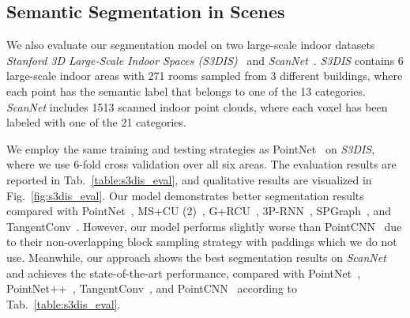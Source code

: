 \documentclass[10pt,twocolumn,letterpaper]{article}
\begin{document}
\subsection{Semantic Segmentation in Scenes}\vspace{-1mm}
\setcounter{figure}{+4}
\begin{figure*}[t]
\centering
{}
\vspace{-3.5mm}
\vspace{-3mm}
\caption{Qualitative results on \emph{S3DIS} dataset. We compare our results with PointNet~\cite{qi2017pointnet} and ground truth. 
The auditorium is a challenging room type and appears only in Area 2. Our model produces much better segmentation result, compared with the result of PointNet.}\vspace{-3mm}
\label{fig:s3dis_eval}
\end{figure*}

We also evaluate our segmentation model on two large-scale indoor datasets \emph{Stanford 3D Large-Scale Indoor Spaces (S3DIS)}~\cite{armeni20163d} and \emph{ScanNet}~\cite{dai2017scannet}. \emph{S3DIS} contains 6 large-scale indoor areas with 271 rooms sampled from 3 different buildings, where each point has the semantic label that belongs to one of the 13 categories. 
\emph{ScanNet} includes 1513 scanned indoor point clouds, where each voxel has been labeled with one of the 21 categories.




We employ the same training and testing strategies as PointNet~\cite{qi2017pointnet} on \emph{S3DIS}, where we use 6-fold cross validation over all six areas. The evaluation results are reported in Tab.~\ref{table:s3dis_eval}, and qualitative results are visualized in Fig.~\ref{fig:s3dis_eval}. Our model demonstrates better segmentation results compared with PointNet~\cite{qi2017pointnet}, MS+CU (2)~\cite{engelmann2017exploring}, G+RCU~\cite{engelmann2017exploring}, 3P-RNN~\cite{Ye_2018_ECCV}, SPGraph~\cite{Landrieu2017LargescalePC}, and TangentConv~\cite{tatarchenko2018tangent}. However, our model performs slightly worse than PointCNN~\cite{li2018pointcnn} due to their non-overlapping block sampling strategy with paddings which we do not use. Meanwhile, our approach shows the best segmentation results on \emph{ScanNet}~\cite{dai2017scannet} and achieves the state-of-the-art performance, compared with PointNet~\cite{qi2017pointnet}, PointNet++~\cite{qi2017pointnet++}, TangentConv~\cite{tatarchenko2018tangent}, and PointCNN~\cite{li2018pointcnn} according to Tab.~\ref{table:s3dis_eval}.
\end{document}
